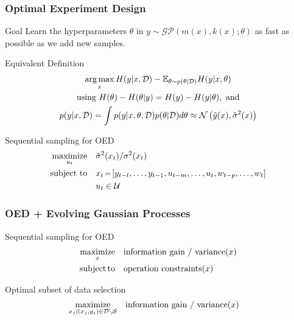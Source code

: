 \begin{frame}[t]
	
	\frametitle{Optimal Experiment Design}
	
	\begin{block}{Goal}
		Learn the hyperparameters \(\theta\) in \(y \sim \mathcal{GP}(m(x), k(x); \theta)\) as fast as possible as we add new samples.
	\end{block}
	
	\begin{block}{Equivalent Definition}
		\setlength\abovedisplayskip{0pt}
		\begin{gather*}
		\argmax_x H(y|x,\D) - \EE_{\theta \sim p(\theta|\D)}H(y|x,\theta) \\
		\text{using} \ H(\theta) - H(\theta|y) = H(y) - H(y|\theta), \ \text{and} \\
		p(y|x,\D) = \int p(y|x,\theta, \D)p(\theta|\D)d\theta \approx \GaussianDist{\tilde{y}(x)}{\tilde{\sigma}^2(x)}
		\label{E:ig:y}
		\end{gather*}
	\end{block}

	\begin{block}{Sequential sampling for OED}
	\setlength\abovedisplayskip{0pt}
	\begin{align*}
		\label{E:oed:sampling}
		\maximize_{u_{t}} & \ \ \ \tilde{\sigma}^2(x_t)/{\sigma}^2(x_t) \\
		\st &  \ \ \ x_{t}\!=\![y_{t-l}, \dots, y_{t-1}, u_{t-m}, \dots, u_t, w_{t-p}, \dots, w_t] \\
		&  \ \ \ u_t \in \mathcal{U} \nonumber
	\end{align*}
\end{block}
	
\end{frame}

\begin{frame}[t]
	
	\frametitle{OED + Evolving Gaussian Processes}
	
	\begin{block}{Sequential sampling for OED}
		\setlength\abovedisplayskip{0pt}
		\begin{align*}
		\operatorname*{maximize}_{x} & \ \ \  \text{information gain / variance}(x) \\
			\operatorname*{subject\,to} & \ \ \ \text{operation constraints}(x)
		\end{align*}
	\end{block}

	\begin{block}{Optimal subset of data selection}
		\setlength\abovedisplayskip{0pt}
		\begin{align*}
		\operatorname*{maximize}_{x_{j}|(x_j,y_j) \in \mathcal{D} \setminus \mathcal{S}} & \ \ \  \text{information gain / variance}(x)
		\end{align*}
	\end{block}
	
\end{frame}

